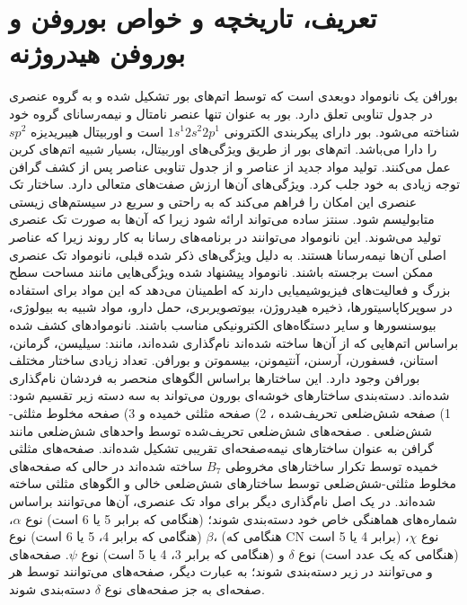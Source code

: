 \section{تعریف، تاریخچه و خواص بوروفن و
بوروفن هیدروژنه
}
بورافن یک نانومواد دوبعدی  است که توسط اتم‌های بور تشکیل شده و به گروه عنصری  در جدول تناوبی تعلق دارد. بور به عنوان تنها عنصر نامتال و نیمه‌رسانای گروه خود شناخته می‌شود. بور دارای پیکربندی الکترونی $1s^1 2s^2 2p^1$ است و اوربیتال هیبریدیزه $sp^2$ را دارا می‌باشد. اتم‌های بور از طریق ویژگی‌های اوربیتال، بسیار شبیه اتم‌های کربن عمل می‌کنند.
تولید مواد  جدید از عناصر  و  از جدول تناوبی عناصر پس از کشف گرافن توجه زیادی به خود جلب کرد. ویژگی‌های آن‌ها ارزش صفت‌های متعالی دارد. ساختار تک عنصری این امکان را فراهم می‌کند که به راحتی و سریع در سیستم‌های زیستی متابولیسم شود. سنتز ساده می‌تواند ارائه شود زیرا که آن‌ها به صورت تک عنصری تولید می‌شوند. این نانومواد  می‌توانند در برنامه‌های رسانا به کار روند زیرا که عناصر اصلی آن‌ها نیمه‌رسانا هستند. به دلیل ویژگی‌های ذکر شده قبلی، نانومواد  تک عنصری ممکن است برجسته باشند. نانومواد  پیشنهاد شده ویژگی‌هایی مانند مساحت سطح بزرگ و فعالیت‌های فیزیوشیمیایی دارند که اطمینان می‌دهد که این مواد برای استفاده در سوپرکاپاسیتورها، ذخیره هیدروژن، بیوتصویربری، حمل دارو، مواد شبیه به بیولوژی، بیوسنسورها و سایر دستگاه‌های الکترونیکی مناسب باشند. نانومواد‌های کشف شده براساس اتم‌هایی که از آن‌ها ساخته شده‌اند نام‌گذاری شده‌اند، مانند: سیلیسن، گرمانن، استانن، فسفورن، آرسنن، آنتیمونن، بیسموتن و بورافن. تعداد زیادی ساختار مختلف بورافن وجود دارد. این ساختارها براساس الگوهای منحصر به فردشان نام‌گذاری شده‌اند. دسته‌بندی ساختارهای خوشه‌ای بورون می‌تواند به سه دسته زیر تقسیم شود: 1) صفحه شش‌ضلعی تحریف‌شده ، 2) صفحه مثلثی خمیده  و 3) صفحه مخلوط مثلثی-شش‌ضلعی . صفحه‌های شش‌ضلعی تحریف‌شده توسط واحدهای شش‌ضلعی مانند گرافن به عنوان ساختارهای نیمه‌صفحه‌ای تقریبی تشکیل شده‌اند. صفحه‌های مثلثی خمیده توسط تکرار ساختارهای مخروطی $B_7$ ساخته شده‌اند در حالی که صفحه‌های مخلوط مثلثی-شش‌ضلعی توسط ساختارهای شش‌ضلعی خالی و الگوهای مثلثی ساخته شده‌اند. در یک اصل نام‌گذاری دیگر برای مواد  تک عنصری، آن‌ها می‌توانند براساس شماره‌های هماهنگی خاص خود دسته‌بندی شوند؛ (هنگامی که  برابر 5 یا 6 است) نوع $\alpha$، (هنگامی که  برابر 4، 5 یا 6 است) نوع $\beta$، (هنگامی که CN برابر 4 یا 5 است) نوع $\chi$، (هنگامی که  یک عدد است) نوع $\delta$ و (هنگامی که  برابر 3، 4 یا 5 است) نوع $\psi$. صفحه‌های  و  می‌توانند در زیر دسته‌بندی شوند؛ به عبارت دیگر، صفحه‌های  می‌توانند توسط هر صفحه‌ای به جز صفحه‌های نوع $\delta$ دسته‌بندی شوند.

